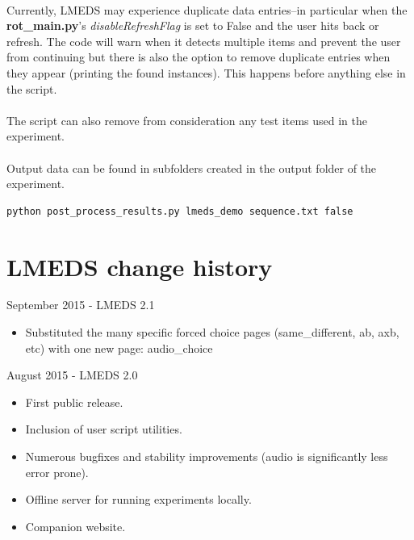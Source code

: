 \documentclass[12pt, oneside]{scrbook}   	%
\begin{document}
\paragraph{}
Currently, LMEDS may experience duplicate data entries--in particular when the \textbf{rot\_main.py}'s \textit{disableRefreshFlag} is set to False and the user hits back or refresh.  The code will warn when it detects multiple items and prevent the user from continuing but there is also the option to remove duplicate entries when they appear (printing the found instances).  This happens before anything else in the script.

\paragraph{}
The script can also remove from consideration any test items used in the experiment.

\paragraph{}
Output data can be found in subfolders created in the output folder of the experiment.

\begin{lstlisting}
python post_process_results.py lmeds_demo sequence.txt false
\end{lstlisting}

\section{LMEDS change history}

September 2015 - LMEDS 2.1

\begin{itemize}
\item Substituted the many specific forced choice pages (same\_different, ab, axb, etc) with one new page: audio\_choice
\end{itemize}

August 2015 - LMEDS 2.0

\begin{itemize}
\item First public release.  
\item Inclusion of user script utilities.
\item Numerous bugfixes and stability improvements (audio is significantly less error prone).  
\item Offline server for running experiments locally.
\item Companion website.
\end{itemize}
\end{document}
